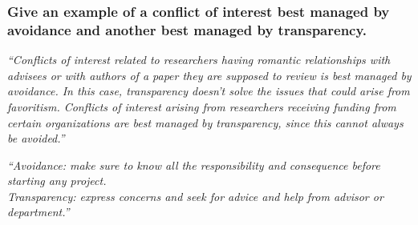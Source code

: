 \documentclass[12pt]{beamer}
\newcommand\ans[1]{{\it ``#1''}}
\newcommand\gap{\vspace{5mm}}
\begin{document}
\begin{frame}
\frametitle{
  Give an example of a conflict of interest best managed by avoidance and another best managed by transparency.
}


\ans{Conflicts of interest related to researchers having romantic relationships with advisees or with authors of a paper they are supposed to review is best managed by avoidance. In  this  case,  transparency  doesn’t  solve  the  issues  that  could  arise  from  favoritism. Conflicts of interest arising from researchers receiving funding from certain organizations are best managed by transparency, since this cannot always be avoided.}

\gap

\ans{Avoidance:  make sure to know all the responsibility and consequence before starting any project.\\
Transparency:  express concerns and seek for advice and help from advisor or department.}







\end{frame}
\end{document}
